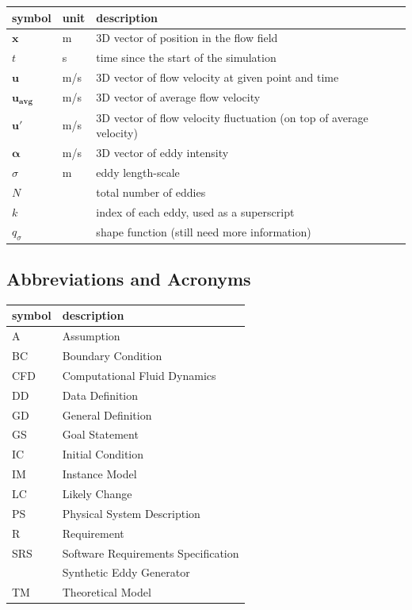\documentclass[12pt]{article}
\begin{document}
\renewcommand{\arraystretch}{1.2}
\noindent \begin{longtable*}{l l p{12cm}} \toprule
\textbf{symbol} & \textbf{unit} & \textbf{description}\\
\midrule 
$\mathbf{x}$ & \si{\metre} & 3D vector of position in the flow field
\\
$t$ & \si{\second} & time since the start of the simulation
\\
$\mathbf{u}$ & \si[per-mode=symbol] {\metre\per\second} & 3D vector of flow velocity at given point and time
\\
$\mathbf{u_{\text{avg}}}$ & \si[per-mode=symbol] {\metre\per\second} & 3D vector of average flow velocity
\\
$\mathbf{u'}$ & \si[per-mode=symbol] {\metre\per\second} & 3D vector of flow velocity fluctuation (on top of average velocity)
\\
$\boldsymbol{\alpha}$ & \si[per-mode=symbol] {\metre\per\second} & 3D vector of eddy intensity
\\
$\sigma$ & \si{\metre} & eddy length-scale
\\ 
$N$ &  & total number of eddies
\\ 
$k$ &  & index of each eddy, used as a superscript
\\
$q_\sigma$ &  & shape function (still need more information)
\\
\bottomrule
\end{longtable*}

\subsection{Abbreviations and Acronyms}

\renewcommand{\arraystretch}{1.2}
\begin{tabular}{l l} 
  \toprule		
  \textbf{symbol} & \textbf{description}\\
  \midrule 
  A & Assumption\\
  BC & Boundary Condition\\
  CFD & Computational Fluid Dynamics\\
  DD & Data Definition\\
  GD & General Definition\\
  GS & Goal Statement\\
  IC & Initial Condition\\
  IM & Instance Model\\
  LC & Likely Change\\
  PS & Physical System Description\\
  R & Requirement\\
  SRS & Software Requirements Specification\\
  \progname{} & Synthetic Eddy Generator\\
  TM & Theoretical Model\\
  \bottomrule
\end{tabular}\\
\end{document}
